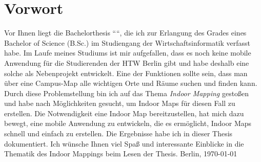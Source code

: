 \chapter*{Vorwort}
Vor Ihnen liegt die Bachelorthesis ``\thetitle``, die ich zur Erlangung des Grades eines Bachelor of Science (B.Sc.) im Studiengang der Wirtschaftsinformatik verfasst habe.
\pbreak
Im Laufe meines Studiums ist mir aufgefallen, dass es noch keine mobile Anwendung für die Studierenden der HTW Berlin gibt und habe deshalb eine solche als Nebenprojekt entwickelt.
Eine der Funktionen sollte sein, dass man über eine Campus-Map alle wichtigen Orte und Räume suchen und finden kann.
Durch diese Problemstellung bin ich auf das Thema \textit{Indoor Mapping} gestoßen und habe nach Möglichkeiten gesucht, um Indoor Maps für diesen Fall zu erstellen.
Die Notwendigkeit eine Indoor Map bereitzustellen, hat mich dazu bewegt, eine mobile Anwendung zu entwickeln, die es ermöglicht, Indoor Maps schnell und einfach zu erstellen.
Die Ergebnisse habe ich in dieser Thesis dokumentiert.
\pbreak
Ich wünsche Ihnen viel Spaß und interessante Einblicke in die Thematik des Indoor Mappings beim Lesen der Thesis.
\pbreak
\theauthor
\pbreak
Berlin, \today
\clearpage
